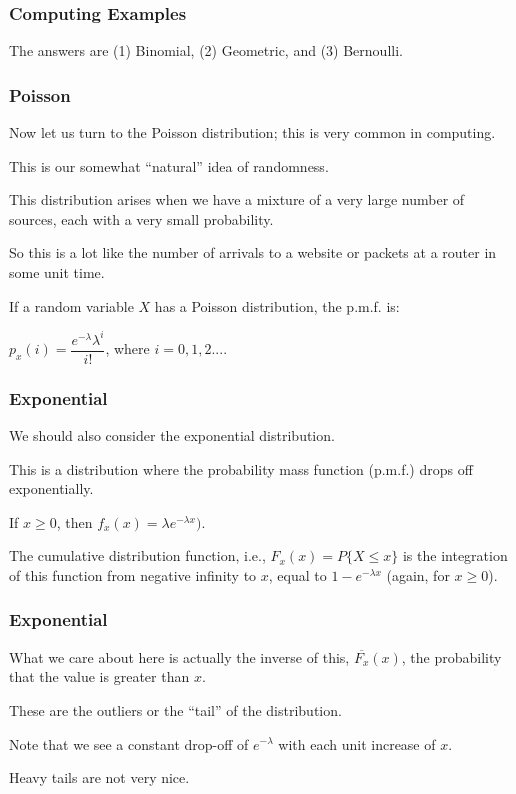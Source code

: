 \begin{frame}
\frametitle{Computing Examples}

The answers are (1) Binomial, (2) Geometric, and (3) Bernoulli.

\end{frame}



\begin{frame}
\frametitle{Poisson}

Now let us turn to the Poisson distribution; this is very common in computing. 

This is our somewhat ``natural'' idea of randomness. 

This distribution arises when we have a mixture of a very large number of sources, each with a very small probability. 

So this is a lot like the number of arrivals to a website or packets at a router in some unit time. 

If a random variable $X$ has a Poisson distribution, the p.m.f. is:

\begin{center}
	$p_{x}(i) = \dfrac{e^{-\lambda}\lambda^{i}}{i!}$, where $i = 0, 1, 2....$
\end{center}

\end{frame}



\begin{frame}
\frametitle{Exponential}

We should also consider the exponential distribution. 

This is a distribution where the probability mass function (p.m.f.) drops off exponentially. 

If $x \geq 0$, then $f_{x}(x) = \lambda e^{-\lambda x})$. 

The cumulative distribution function, i.e., $F_{x}(x) = P\{ X \leq x \}$ is the integration of this function from negative infinity to $x$, equal to $1-e^{-\lambda x}$ (again, for $x \geq 0$). 

\end{frame}



\begin{frame}
\frametitle{Exponential}

What we care about here is actually the inverse of this, $\overline{F_{x}}(x)$, the probability that the value is greater than $x$.

These are the outliers or the ``tail'' of the distribution. 

Note that we see a constant drop-off of $e^{-\lambda}$ with each unit increase of $x$. 

Heavy tails are not very nice. 

\end{frame}




